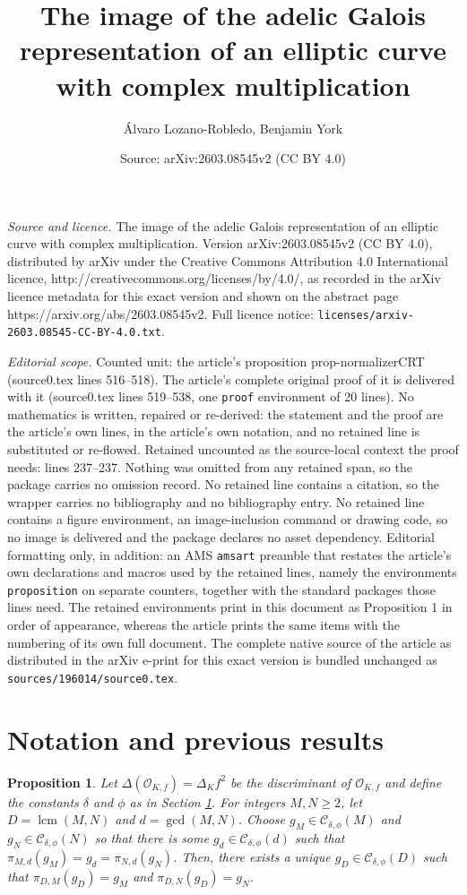 \documentclass[10pt,a4paper]{amsart}
\title{The image of the adelic Galois representation of an elliptic curve with complex multiplication}
\author{\'Alvaro Lozano-Robledo, Benjamin York}
\date{Source: arXiv:2603.08545v2 (CC BY 4.0)}
\newtheorem{proposition}{Proposition}
\newcommand{\Of}{\mathcal{O}_{K,f}}
\newcommand{\lcm}{\operatorname{lcm}}
\begin{document}
\maketitle

\noindent\emph{Source and licence.} The image of the adelic Galois representation of an elliptic curve with complex multiplication. Version arXiv:2603.08545v2 (CC BY 4.0), distributed by arXiv under the Creative Commons Attribution 4.0 International licence, http://creativecommons.org/licenses/by/4.0/, as recorded in the arXiv licence metadata for this exact version and shown on the abstract page https://arxiv.org/abs/2603.08545v2. Full licence notice: \texttt{licenses/arxiv-2603.08545-CC-BY-4.0.txt}.\par\smallskip

\noindent\textit{Editorial scope.} Counted unit: the article's proposition prop-normalizerCRT (source0.tex lines 516--518). The article's complete original proof of it is delivered with it (source0.tex lines 519--538, one \texttt{proof} environment of 20 lines). No mathematics is written, repaired or re-derived: the statement and the proof are the article's own lines, in the article's own notation, and no retained line is substituted or re-flowed.  Retained uncounted as the source-local context the proof needs: lines 237--237.  Nothing was omitted from any retained span, so the package carries no omission record.  No retained line contains a citation, so the wrapper carries no bibliography and no bibliography entry.  No retained line contains a figure environment, an image-inclusion command or drawing code, so no image is delivered and the package declares no asset dependency.  Editorial formatting only, in addition: an AMS \texttt{amsart} preamble that restates the article's own declarations and macros used by the retained lines, namely the environments \texttt{proposition} on separate counters, together with the standard packages those lines need.  The retained environments print in this document as Proposition 1 in order of appearance, whereas the article prints the same items with the numbering of its own full document.  The complete native source of the article as distributed in the arXiv e-print for this exact version is bundled unchanged as \texttt{sources/196014/source0.tex}.
\section{Notation and previous results}\label{sec-notation}

\begin{proposition}\label{prop-normalizerCRT}
    Let $\Delta(\Of)=\Delta_K f^2$ be the discriminant of $\Of$ and define the constants $\delta$ and $\phi$ as in Section \ref{sec-notation}. For integers $M, N \geq 2$, let $D = \lcm(M,N)$ and $d = \gcd(M,N)$. Choose $g_{M} \in \mathcal{C}_{\delta, \phi}(M)$ and $g_{N} \in \mathcal{C}_{\delta, \phi}(N)$ so that there is some $g_d \in \mathcal{C}_{\delta, \phi}(d)$ such that $\pi_{M,d}(g_M) = g_d = \pi_{N,d}(g_N)$.    Then, there exists a unique $g_D \in \mathcal{C}_{\delta, \phi}(D)$ such that $\pi_{D,M}(g_D) = g_M$ and $\pi_{D,N}(g_D) = g_N$.
\end{proposition}
\end{document}
